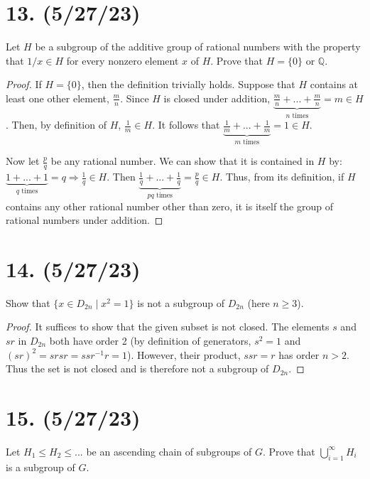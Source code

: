 \documentclass{article}
\begin{document}
\section*{13. (5/27/23)}

Let $H$ be a subgroup of the additive group of rational numbers with the property that $1/x \in H$ for every nonzero element $x$ of $H$. Prove that $H = \{ 0 \}$ or $\mathbb{Q}$.

\begin{proof}
    If $H = \{ 0 \}$, then the definition trivially holds. Suppose that $H$ contains at least one other element, $\frac{m}{n}$. Since $H$ is closed under addition, $\underbrace{\frac{m}{n} + ... + \frac{m}{n}}_{n \text{ times}} = m \in H$. Then, by definition of $H$, $\frac{1}{m} \in H$. It follows that $\underbrace{\frac{1}{m} + ... + \frac{1}{m}}_{m \text{ times}} = 1 \in H$.

    Now let $\frac{p}{q}$ be any rational number. We can show that it is contained in $H$ by: $\underbrace{1 + ... + 1}_{q \text{ times}} = q \Rightarrow \frac{1}{q} \in H$. Then $\underbrace{\frac{1}{q} + ... + \frac{1}{q}}_{pq \text{ times}} = \frac{p}{q} \in H$. Thus, from its definition, if $H$ contains any other rational number other than zero, it is itself the group of rational numbers under addition.
\end{proof}

\section*{14. (5/27/23)}

Show that $\{ x \in D_{2n} \mid x^2 = 1 \}$ is not a subgroup of $D_{2n}$ (here $n \geq 3$).

\begin{proof}
    It suffices to show that the given subset is not closed. The elements $s$ and $sr$ in $D_{2n}$ both have order 2 (by definition of generators, $s^2 = 1$ and $(sr)^2 = srsr = ssr^{-1}r = 1$). However, their product, $ssr = r$ has order $n > 2$. Thus the set is not closed and is therefore not a subgroup of $D_{2n}$.
\end{proof}

\section*{15. (5/27/23)}

Let $H_1 \leq H_2 \leq ...$ be an ascending chain of subgroups of $G$. Prove that $\bigcup^\infty_{i = 1}{H_i}$ is a subgroup of $G$.
\end{document}
